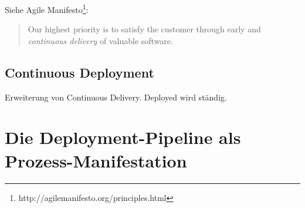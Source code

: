 Siehe Agile Manifesto\footnote{http://agilemanifesto.org/principles.html}:

\begin{quote}
  Our highest priority is to satisfy the customer through early and \emph{continuous delivery} of valuable software.
\end{quote}


\subsection{Continuous Deployment}

Erweiterung von Continuous Delivery. Deployed wird ständig.


\section{Die Deployment-Pipeline als Prozess-Manifestation}
